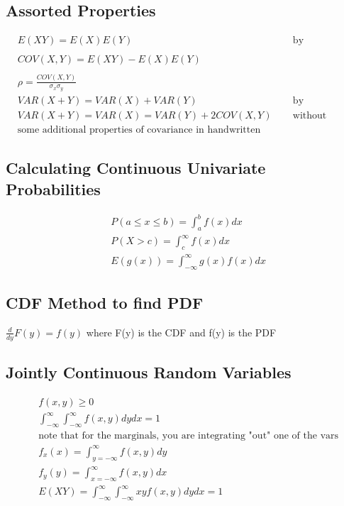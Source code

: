 \documentclass[11pt]{article}
\begin{document}
\subsection*{Assorted Properties}
\begin{align*}
&E(XY) = E(X)E(Y) & \text{by independence} \\
\\
&COV(X,Y) = E(XY) - E(X)E(Y) \\
\\
&\rho = \frac{COV(X,Y)}{\sigma_x \sigma_y}
\\
&VAR(X+Y) = VAR(X) + VAR(Y) &\text{by independence} \\
&VAR(X+Y) = VAR(X) = VAR(Y) + 2COV(X,Y) &\text{without independence}
\\
&\text{some additional properties of covariance in handwritten notes if needed}
\end{align*}

\subsection*{Calculating Continuous Univariate Probabilities}
\begin{align*}
&P(a \leq x \leq b) = \int_{a}^{b} f(x) dx\\ 
&P(X>c) = \int_{c}^{\infty} f(x) dx\\
&E(g(x)) = \int_{-\infty}^{\infty} g(x) f(x) dx
\end{align*}

\subsection*{CDF Method to find PDF}
$\frac{d}{dy}F(y) = f(y)$ where F(y) is the CDF and f(y) is the PDF

\subsection*{Jointly Continuous Random Variables}
\begin{align*}
&f(x,y) \geq 0 \\
& \int_{-\infty}^{\infty} \int_{-\infty}^{\infty}  f(x,y) dydx = 1\\
&\text{note that for the marginals, you are integrating "out" one of the vars}\\
&f_x(x) = \int_{y=-\infty}^{\infty} f(x,y)dy\\
&f_y(y) = \int_{x=-\infty}^{\infty} f(x,y)dx\\
& E(XY) = \int_{-\infty}^{\infty} \int_{-\infty}^{\infty}  xyf(x,y) dydx = 1\\
\end{align*}
\end{document}
